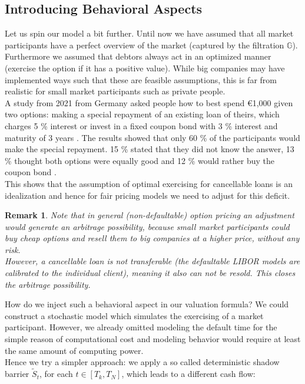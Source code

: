 \documentclass[12pt]{article}
\newtheorem{remark}[theorem]{Remark}
\begin{document}
	\subsection{Introducing Behavioral Aspects}
	Let us spin our model a bit further. Until now we have assumed that all market participants have a perfect overview of the market (captured by the filtration $\mathbb{G}$). Furthermore we assumed that debtors always act in an optimized manner (exercise the option if it has a positive value). While big companies may have implemented ways such that these are feasible assumptions, this is far from realistic for small market participants such as private people.\\
	A study from 2021 from Germany asked people how to best spend €1,000 given two options: making a special repayment of an existing loan of theirs, which charges 5 \% interest or invest in a fixed coupon bond with 3 \% interest and maturity of 3 years \cite{finKnowledgeStudy}.
	The results showed that only 60 \% of the participants would make the special repayment. 15 \% stated that they did not know the answer, 13 \% thought both options were equally good and 12 \% would rather buy the coupon bond \cite{finKnowledgeStudy}.\\
	This shows that the assumption of optimal exercising for cancellable loans is an idealization and hence for fair pricing models we need to adjust for this deficit.
	
	\begin{remark}
		Note that in general (non-defaultable) option pricing an adjustment would generate an arbitrage possibility, because small market participants could buy cheap options and resell them to big companies at a higher price, without any risk.\\
		However, a cancellable loan is not transferable (the defaultable LIBOR models are calibrated to the individual client), meaning it also can not be resold. This closes the arbitrage possibility.
	\end{remark}
	
	How do we inject such a behavioral aspect in our valuation formula? We could construct a stochastic model which simulates the exercising of a market participant. However, we already omitted modeling the default time for the simple reason of computational cost and modeling behavior would require at least the same amount of computing power.\\
	Hence we try a simpler approach: we apply a so called deterministic shadow barrier $\tilde{S}_t$, for each $t \in \left[T_k,T_N\right]$, which leads to a different cash flow:
	
\end{document}
